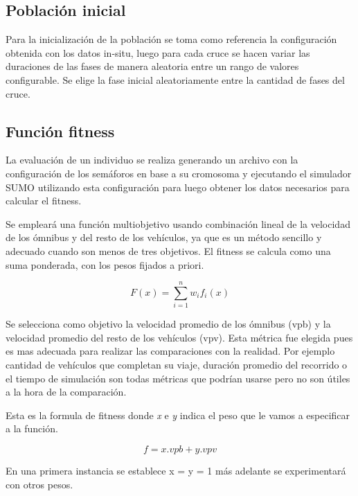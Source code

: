 \subsection{Población inicial}

Para la inicialización de la población se toma como referencia
la configuración obtenida con los datos in-situ, luego para cada
cruce se hacen variar las duraciones de las fases de manera aleatoria entre un rango de valores configurable. Se elige la fase inicial aleatoriamente entre la cantidad de fases del cruce.

\subsection{Función fitness}


La evaluación de un individuo se realiza generando un archivo con la configuración de los semáforos en base a su cromosoma y ejecutando el simulador SUMO utilizando esta configuración para luego obtener los datos necesarios para calcular el fitness.

Se empleará una función multiobjetivo usando combinación lineal de la velocidad de los ómnibus y del resto de los vehículos, ya que es un método sencillo y adecuado cuando son menos de tres objetivos. El fitness se calcula como una suma ponderada, con los pesos fijados a priori.

        \begin{equation}
        \label{eq:funcion_fitness_generica}
		F(x) = \sum_{i=1}^{n}{w_i}{f_i}(x)
        \end{equation}

Se selecciona como objetivo la velocidad promedio de los ómnibus (vpb) y la velocidad promedio del resto de los vehículos (vpv). Esta métrica fue elegida pues es mas adecuada para realizar las comparaciones con la realidad. Por ejemplo cantidad de vehículos que completan su viaje, duración promedio del recorrido o el tiempo de simulación son todas métricas que podrían usarse pero no son útiles a la hora de la comparación.

Esta es la formula de fitness donde \emph{x} e \emph{y} indica el peso que le vamos a especificar a la función. 

        \begin{equation}
        \label{eq:funcion_fitness}
        f = x.vpb + y.vpv
        \end{equation}
        
En una primera instancia se establece x = y = 1 más adelante se experimentará con otros pesos.


